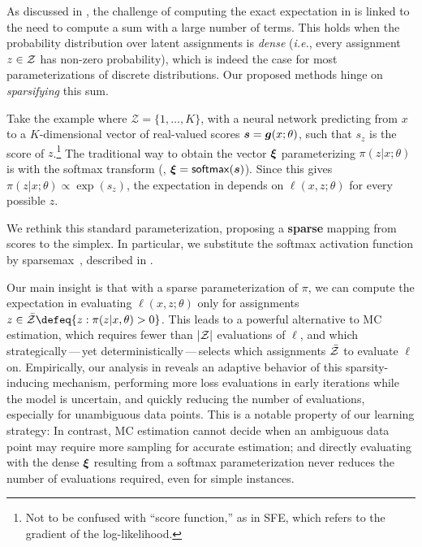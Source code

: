 \noindent As discussed in , the challenge of computing the
exact expectation in  is linked to the need to compute
a sum with a large number of terms. This holds when the probability
distribution over latent assignments is {\it dense} ({\it i.e.},
every assignment $z \in \mathcal{Z}$ has non-zero probability), which is
indeed the case for most parameterizations of discrete distributions.
Our proposed methods hinge on {\it sparsifying} this sum.

Take the example where $\mathcal Z = \{1, \ldots, K\}$, with a neural
network predicting from $x$ to a $K$-dimensional vector of real-valued
scores $\bm{s} = \bm{g}(x; \theta)$, such that $s_z$ is the score of
$z$.\footnote{Not to be confused with ``score function,'' as in SFE,
    which refers to the gradient of the log-likelihood.} The traditional
way to obtain the vector $\bm{\xi}$ parameterizing $\pi(z|x;\theta)$ is
with the softmax transform (\ie, $\bm{\xi} = \operatorname*{\mathsf{softmax}}(\bm{s})$). Since this
gives $\pi(z|x;\theta) \propto \exp(s_z)$, the expectation in
 depends on $\ell(x, z; \theta)$ for every possible
$z$.

We rethink this standard parameterization, proposing a
\textbf{sparse} mapping from scores to the simplex. In particular, we
substitute the softmax activation function by
sparsemax~\citep{sparsemax}, described in
.

Our main insight is that with a sparse parameterization of $\pi$, we
can compute the expectation in  evaluating $\ell(x, z;
    \theta)$ only for assignments $z \in \bar\ZZ \defeq \{z : \pi(z | x,
    \theta) > 0\}$. This leads to a powerful alternative to MC
estimation, which requires fewer than $|\mathcal{Z}|$ evaluations of $\ell$,
and which strategically\,---\,yet deterministically\,---\,selects
which assignments $\bar{\mathcal{Z}}$ to evaluate $\ell$ on. Empirically, our
analysis in  reveals an adaptive behavior of
this sparsity-inducing mechanism, performing more loss evaluations in
early iterations while the model is uncertain, and quickly reducing
the number of evaluations, especially for unambiguous data points.
This is a notable property of our learning strategy: In contrast, MC
estimation cannot decide when an ambiguous data point may require
more sampling for accurate estimation; and directly evaluating
 with the dense $\bm{\xi}$ resulting from a softmax
parameterization never reduces the number of evaluations required,
even for simple instances.

